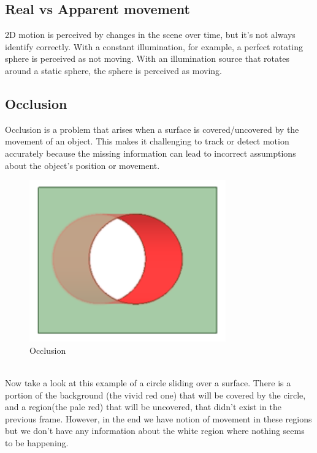 \subsection{Real vs Apparent movement}
2D motion is perceived by changes in the scene over time, but it's not always identify correctly. With a constant illumination, for example, a perfect rotating sphere is perceived as not moving. With an illumination source that rotates around a static sphere, the sphere is perceived as moving.
\subsection{Occlusion}
Occlusion is a problem that arises when a surface is covered/uncovered by the movement of an object.
This makes it challenging to track or detect motion accurately because the missing information can lead to incorrect assumptions about the object's position or movement.
\begin{figure}[h]
    \centering
    \includegraphics[scale=0.5]{Figures/Occlusion.png}
    \caption{Occlusion} 
\end{figure}\\
Now take a look at this example of a circle sliding over a surface. 
There is a portion of the background (the vivid red one) that will be covered by the circle, and a region(the pale red) that will be uncovered, that didn't exist in the previous frame. 
However, in the end we have notion of movement in these regions but we don't have any information about the white region where nothing seems to be happening. 
